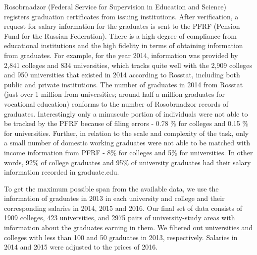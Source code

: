 \documentclass[alpha-refs]{wiley-article-05g}
\begin{document}
Rosobrnadzor (Federal Service for Supervision in Education and Science) 
registers graduation certificates from issuing institutions. After 
verification, a request for salary information for the graduates is sent to 
the PFRF (Pension Fund for the Russian Federation).  There is a high degree 
of compliance from educational institutions and the high fidelity in terms 
of obtaining information from graduates. For example, for the year 2014, 
information was provided by 2,841 colleges and 834 universities, which 
tracks quite well with the 2,909 colleges and 950 universities that existed 
in 2014 according to Rosstat, including both public and private 
institutions. The number of graduates in 2014 from Rosstat (just over 1 
million from universities; around half a million graduates for vocational 
education) conforms to the number of Rosobrnadzor records of graduates. 
Interestingly only a minuscule portion of individuals were not able to be 
tracked by the PFRF because of filing errors - 0.78 \% for colleges and 
0.15 \% for universities. Further, in relation to the scale and complexity 
of the task, only a  small number of domestic working graduates were not 
able to be matched with income information from PFRF - 8\% for colleges and 
5\% for universities. In other words, 92\% of college graduates and 95\% of 
university graduates had their salary information recorded in graduate.edu. 

\vspace{0.5em}

To get the maximum possible span from the available data,  we use the information of graduates in 2013 in each university and college and their corresponding salaries in 2014, 2015 and 2016. Our final set of data consists of 1909 colleges, 423 universities, and 2975 pairs of university-study areas with information about the graduates earning in them. We filtered out universities and colleges with less than 100 and 50 graduates in 2013, respectively. Salaries in 2014 and 2015 were adjusted to the prices of 2016. 
\end{document}
